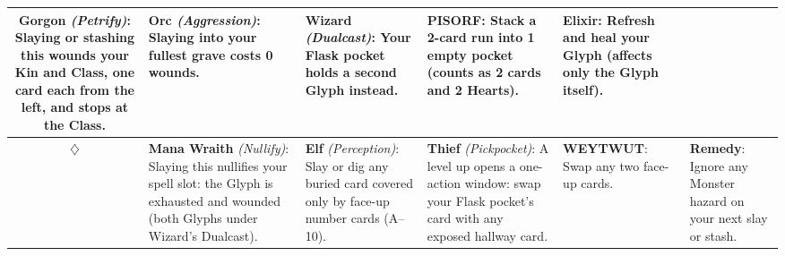\documentclass[10pt]{article}
\begin{document}
{\begin{tabularx}{\linewidth}{@{}c@{\hspace{5pt}}*{5}{!{\color{ink!18}\vrule}@{\hspace{5pt}}>{\raggedright\arraybackslash}X@{\hspace{4pt}}}}
			\textbf{Gorgon} \emph{(Petrify)}: Slaying or stashing this wounds your Kin and Class, one card each from the left, and stops at the Class. &
			\textbf{Orc} \emph{(Aggression)}: Slaying into your fullest grave costs 0 wounds. &
			\textbf{Wizard} \emph{(Dualcast)}: Your Flask pocket holds a second Glyph instead. &
			\textbf{PISORF}: Stack a 2-card run into 1 empty pocket (counts as 2 cards and 2 Hearts). &
			\textbf{Elixir}: Refresh and heal your Glyph (affects only the Glyph itself). \\
			\midrule
			{\large\color{ink!65}$\diamondsuit$} &
			\textbf{Mana Wraith} \emph{(Nullify)}: Slaying this nullifies your spell slot: the Glyph is exhausted and wounded (both Glyphs under Wizard's Dualcast). &
			\textbf{Elf} \emph{(Perception)}: Slay or dig any buried card covered only by face-up number cards (A--10). &
			\textbf{Thief} \emph{(Pickpocket)}: A level up opens a one-action window: swap your Flask pocket's card with any exposed hallway card. &
			\textbf{WEYTWUT}: Swap any two face-up cards. &
			\textbf{Remedy}: Ignore any Monster hazard on your next slay or stash. \\
			\bottomrule
	\end{tabularx}}
	
\end{document}
